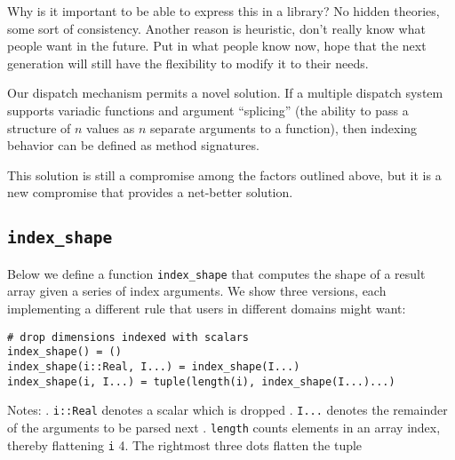 \documentclass[preprint]{sigplanconf}
\begin{document}

Why is it important to be able to express this in a library? No hidden
theories, some sort of consistency. Another reason is heuristic, don't really
know what people want in the future. Put in what people know now, hope that
the next generation will still have the flexibility to modify it to their
needs.

Our dispatch mechanism permits a novel solution. If a multiple dispatch system
supports variadic functions and argument ``splicing'' (the ability to pass a
structure of $n$ values as $n$ separate arguments to a function), then
indexing behavior can be defined as method signatures.

This solution is still a compromise among the factors outlined above, but it
is a new compromise that provides a net-better solution.


\subsection{\texttt{index\_shape}}

Below we define a function \texttt{index\_shape} that computes the shape of a
result array given a series of index arguments. We show three versions, each
implementing a different rule that users in different domains might want:

{\small
\begin{verbatim}
# drop dimensions indexed with scalars
index_shape() = ()
index_shape(i::Real, I...) = index_shape(I...)
index_shape(i, I...) = tuple(length(i), index_shape(I...)...)
\end{verbatim}
}

\noindent Notes: . \verb+i::Real+ denotes a scalar which is dropped . \verb+I...+ denotes the remainder of the arguments to be parsed next . \verb+length+ counts  elements in an array index, thereby flattening \verb+i+
4. The rightmost three dots flatten the tuple
\end{document}
